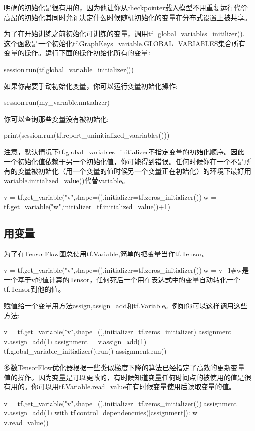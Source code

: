 明确的初始化是很有用的，因为他让你从checkpointer载入模型不用重复运行代价高昂的初始化其同时允许决定什么时候随机初始化的变量在分布式设置上被共享。

为了在开始训练之前初始化可训练的变量，调用tf\_global\_variables\_initilizer().这个函数是一个初始化tf.GraphKeys\_variable.GLOBAL\_VARIABLES集合所有变量的操作。运行下面的操作初始化所有的变量:
\begin{python}
session.run(tf.global_variable_initializer())
\end{python}
如果你需要手动初始化变量，你可以运行变量初始化操作:
\begin{python}
session.run(my_variable.initializer)
\end{python}
你可以查询那些变量没有被初始化:
\begin{python}
print(session.run(tf.report_uninitialized_vaariables()))
\end{python}
注意，默认情况下tf.global\_variables\_initializer不指定变量的初始化顺序。因此一个初始化值依赖于另一个初始化值，你可能得到错误。任何时候你在一个不是所有的变量被初始化（用一个变量的值时候另一个变量正在初始化）的环境下最好用variable.initialized\_value()代替variable。
\begin{python}
v = tf.get_variable("v",shape=(),initializer=tf.zeros_initializer())
w = tf.get_variable("w",initializer=tf.initialized_value()+1)
\end{python}
\subsection{用变量}
为了在TensorFlow图总使用tf.Variable,简单的把变量当作tf.Tensor。
\begin{python}
v = tf.get_variable("v",shape=(),initializer=tf.zeros_initializer())
w = v+1#w是一个基于v的值计算的Tensor，任何死后一个用在表达式中的变量自动转化一个tf.Tensor到他的值。
\end{python}
赋值给一个变量用方法assign,assign\_add和tf.Variable。例如你可以这样调用这些方法:
\begin{python}
v = tf.get_variable("v",shape=(),initializer=tf.zeros_initializer)
	assignment = v.assign_add(1)
assignment = v.assign_add(1)
tf.global_variable_initializer().run()
assignment.run()
\end{python}
多数TensorFlow优化器根据一些类似梯度下降的算法已经指定了高效的更新变量值的操作。因为变量是可以更改的，有时候知道变量任何时间点的被使用的值是很有用的。你可以用tf.Variable.read\_value在有时候变量使用后读取变量的值。
\begin{python}
v = tf.get_variable("v",shape=(),initializer=tf.zeros\_initializer())
assignment = v.assign_add(1)
with tf.control_dependencuies([assignment]):
    w = v.read_value()
\end{python}
